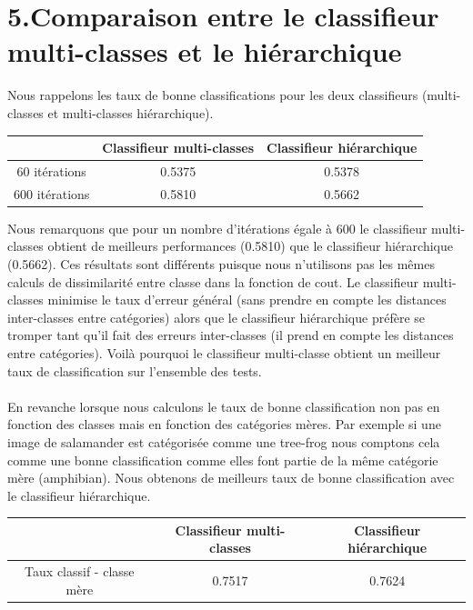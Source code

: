 \documentclass[a4paper,11pt]{report}
\begin{document}
\section*{5.Comparaison entre le classifieur multi-classes et le hiérarchique}
Nous rappelons les taux de bonne classifications pour les deux classifieurs (multi-classes et multi-classes hiérarchique).\\
\begin{center}
\begin{tabular}{|c|c|c|}
\hline
&Classifieur multi-classes &  Classifieur hiérarchique \\
\hline
\hline
60 itérations & 0.5375 & 0.5378\\
600 itérations & 0.5810 & 0.5662\\
\hline
\end{tabular}
\end{center}
 Nous remarquons que pour un nombre d'itérations égale à 600 le classifieur multi-classes obtient de meilleurs performances (0.5810) que le classifieur hiérarchique (0.5662). Ces résultats sont différents puisque nous n'utilisons pas les mêmes calculs de dissimilarité entre classe dans la fonction de cout. Le classifieur multi-classes minimise le taux d'erreur général (sans prendre en compte les distances inter-classes entre catégories) alors que le classifieur hiérarchique préfère se tromper tant qu'il fait des erreurs inter-classes (il prend en compte les distances entre catégories). Voilà pourquoi le classifieur multi-classe obtient un meilleur taux de classification sur l'ensemble des tests.\\\\
En revanche lorsque nous calculons le taux de bonne classification non pas en fonction des classes mais en fonction des catégories mères. Par exemple si une image de salamander est catégorisée comme une tree-frog nous comptons cela comme une bonne classification comme elles font partie de la même catégorie mère (amphibian). Nous obtenons de meilleurs taux de bonne classification avec le classifieur hiérarchique.

\begin{center}
\begin{tabular}{|c|c|c|}
\hline
&Classifieur multi-classes &  Classifieur hiérarchique \\
\hline
\hline
Taux classif - classe mère & 0.7517 & 0.7624\\

\hline
\end{tabular}
\end{center}
\end{document}
